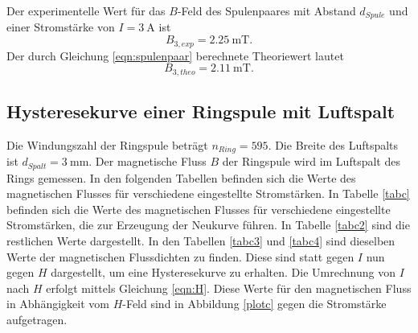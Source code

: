 \noindent Der experimentelle Wert für das $B$-Feld des Spulenpaares
mit Abstand $d_{Spule}$ und einer Stromstärke von $I = \SI{3}{\ampere}$
ist
\begin{equation*}
   B_{3,exp} = \SI{2.25}{\milli\tesla}.
\end{equation*}
Der durch Gleichung \eqref{eqn:spulenpaar} berechnete Theoriewert
lautet
\begin{equation*}
   B_{3,theo} = \SI{2.11}{\milli\tesla}.
\end{equation*}

\subsection{Hysteresekurve einer Ringspule mit Luftspalt}
Die Windungszahl der Ringspule beträgt $n_{Ring} = \num{595}$.
Die Breite des Luftspalts ist $d_{Spalt} = \SI{3}{\milli\meter}$.
\newline
Der magnetische Fluss $B$ der Ringspule wird im Luftspalt
des Rings gemessen.
In den folgenden Tabellen befinden sich die Werte des magnetischen
Flusses für verschiedene eingestellte Stromstärken.
In Tabelle \ref{tabc} befinden sich die Werte des magnetischen Flusses
für verschiedene eingestellte Stromstärken, die zur Erzeugung der Neukurve
führen. In Tabelle \ref{tabc2} sind die restlichen Werte dargestellt.
\newline
In den Tabellen \ref{tabc3} und \ref{tabc4} sind dieselben Werte der
magnetischen Flussdichten zu finden. Diese sind statt gegen $I$ nun
gegen $H$ dargestellt, um eine Hysteresekurve zu erhalten.
Die Umrechnung von $I$ nach $H$ erfolgt mittels Gleichung \eqref{eqn:H}.
\newline
Diese Werte für den magnetischen Fluss in Abhängigkeit vom
$H$-Feld sind in Abbildung \ref{plotc} gegen die Stromstärke aufgetragen.





